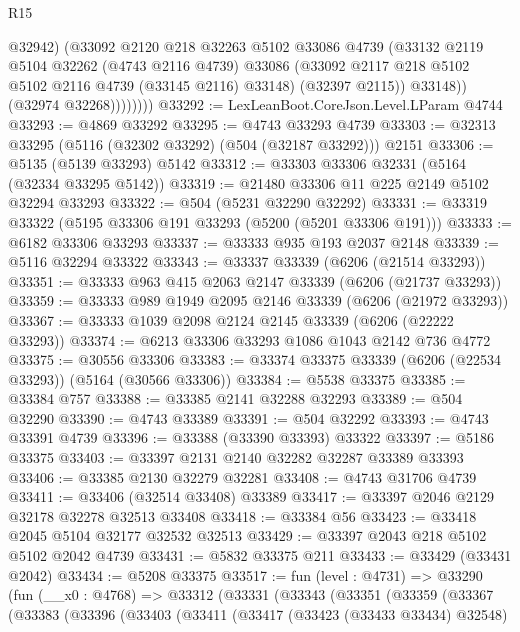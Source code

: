 \begin{lexlean}{R15}
\begin{coremodule}
{{{{{{{{{{{                      @32942)
                    (@33092
                      @2120
                      @218
                      @32263
                      @5102
                      @33086
                      @4739
                      (@33132
                        @2119
                        @5104
                        @32262
                        (@4743 @2116 @4739)
                        @33086
                        (@33092 @2117 @218 @5102 @5102 @2116 @4739 (@33145 @2116) @33148)
                        (@32397 @2115))
                      @33148))
                  (@32974 @32268))))))))
@33292 := LexLeanBoot.CoreJson.Level.LParam @4744
@33293 := @4869 @33292
@33295 := @4743 @33293 @4739
@33303 := @32313 @33295 (@5116 (@32302 @33292) (@504 (@32187 @33292))) @2151
@33306 := @5135 (@5139 @33293) @5142
@33312 := @33303 @33306 @32331 (@5164 (@32334 @33295 @5142))
@33319 := @21480 @33306 @11 @225 @2149 @5102 @32294 @33293
@33322 := @504 (@5231 @32290 @32292)
@33331 := @33319 @33322 (@5195 @33306 @191 @33293 (@5200 (@5201 @33306 @191)))
@33333 := @6182 @33306 @33293
@33337 := @33333 @935 @193 @2037 @2148
@33339 := @5116 @32294 @33322
@33343 := @33337 @33339 (@6206 (@21514 @33293))
@33351 := @33333 @963 @415 @2063 @2147 @33339 (@6206 (@21737 @33293))
@33359 := @33333 @989 @1949 @2095 @2146 @33339 (@6206 (@21972 @33293))
@33367 := @33333 @1039 @2098 @2124 @2145 @33339 (@6206 (@22222 @33293))
@33374 := @6213 @33306 @33293 @1086 @1043 @2142 @736 @4772
@33375 := @30556 @33306
@33383 := @33374 @33375 @33339 (@6206 (@22534 @33293)) (@5164 (@30566 @33306))
@33384 := @5538 @33375
@33385 := @33384 @757
@33388 := @33385 @2141 @32288 @32293
@33389 := @504 @32290
@33390 := @4743 @33389
@33391 := @504 @32292
@33393 := @4743 @33391 @4739
@33396 := @33388 (@33390 @33393) @33322
@33397 := @5186 @33375
@33403 := @33397 @2131 @2140 @32282 @32287 @33389 @33393
@33406 := @33385 @2130 @32279 @32281
@33408 := @4743 @31706 @4739
@33411 := @33406 (@32514 @33408) @33389
@33417 := @33397 @2046 @2129 @32178 @32278 @32513 @33408
@33418 := @33384 @56
@33423 := @33418 @2045 @5104 @32177 @32532 @32513
@33429 := @33397 @2043 @218 @5102 @5102 @2042 @4739
@33431 := @5832 @33375 @211
@33433 := @33429 (@33431 @2042)
@33434 := @5208 @33375
@33517 := fun (level : @4731) =>
  @33290
    (fun (__x0 : @4768) =>
    @33312
      (@33331
        (@33343
          (@33351
            (@33359
              (@33367
                (@33383
                  (@33396
                    (@33403
                      (@33411
                        (@33417
                          (@33423 (@33433 @33434) @32548)
}}}}}}}}}}}
\end{coremodule}
\end{lexlean}
